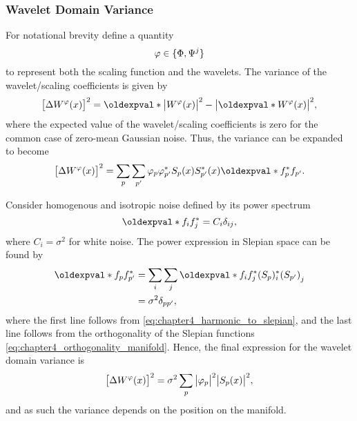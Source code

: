 \subsubsection{Wavelet Domain Variance}

For notational brevity define a quantity
%
\begin{equation}
	\varphi \in \{\Phi,\Psi^{j}\}
\end{equation}
%
to represent both the scaling function and the wavelets.
The variance of the wavelet/scaling coefficients is given by
%
\begin{equation}
	\variance{\mesh{W^{\varphi}}}
	= \expval{\abs{\mesh{W^{\varphi}}}^{2}}
	-\abs{\expval{\mesh{W^{\varphi}}}}^{2},
\end{equation}
%
where the expected value of the wavelet/scaling coefficients is zero for the common case of zero-mean Gaussian noise.
Thus, the variance can be expanded to become
%
\begin{equation}\label{eq:chapter4_slepian_isotropic_noise}
	\variance{\mesh{W^{\varphi}}}
	= \slepianSum \slepianSum['] \slepian{\varphi} \conj{\slepian[']{\varphi}} \mesh{\slepian{S}} \mesh{\conj{\slepian[']{S}}} \expval{\conj{\slepian{f}} \slepian[']{f}}.
\end{equation}

Consider homogenous and isotropic noise defined by its power spectrum
%
\begin{equation}
	\expval{f_{i} \conj{f_{j}}}
	= C_{i} \delta_{i j},
\end{equation}
%
where \(C_{i} = \sigma^{2}\) for white noise.
The power expression in Slepian space can be found by
%
\begin{align}
	\expval{\slepian{f} \conj{\slepian[']{f}}}
	 & = \sum\limits_{i} \sum\limits_{j} \expval{f_{i} \conj{f_{j}}} \empty{} \conj{(\slepian{S})}_{i} {(\slepian[']{S})}_{j} \nonumber \\
	 & = \sigma^{2} \delta_{pp'},
\end{align}
%
where the first line follows from \cref{eq:chapter4_harmonic_to_slepian}, and the last line follows from the orthogonality of the Slepian functions \cref{eq:chapter4_orthogonality_manifold}.
Hence, the final expression for the wavelet domain variance is
%
\begin{equation}
	{\big[\Delta W^{\varphi}(x)\big]}^{2}
	= \sigma^{2} \sum\limits_{p} \big\lvert{\varphi}_{p}\big\rvert^{2} \big\lvert{S}_{p}(x)\big\rvert^{2},
\end{equation}
%
and as such the variance depends on the position on the manifold.

